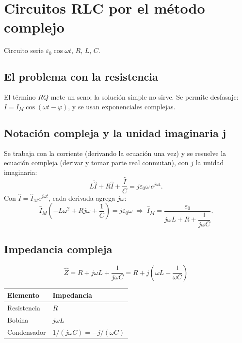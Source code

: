 \documentclass[12pt,a4paper]{article}
\begin{document}
\section{Circuitos RLC por el método complejo}

Circuito serie $\varepsilon_0\cos\omega t$, $R$, $L$, $C$.

\subsection{El problema con la resistencia}

El término $R\dot Q$ mete un seno; la solución simple no sirve. Se permite
desfasaje: $I = I_M\cos(\omega t - \varphi)$, y se usan exponenciales
complejas.

\subsection{Notación compleja y la unidad imaginaria j}

Se trabaja con la corriente (derivando la ecuación una vez) y se resuelve la
ecuación compleja (derivar y tomar parte real conmutan), con $j$ la unidad
imaginaria:
\[
L\ddot{\hat I} + R\dot{\hat I} + \frac{\hat I}{C} = j\varepsilon_0\omega\,
e^{j\omega t}.
\]
Con $\hat I = \hat I_M e^{j\omega t}$, cada derivada agrega $j\omega$:
\[
\hat I_M\left(-L\omega^2 + Rj\omega + \frac{1}{C}\right) = j\varepsilon_0\omega
\;\Longrightarrow\;
\hat I_M = \frac{\varepsilon_0}{j\omega L + R + \dfrac{1}{j\omega C}}.
\]

\subsection{Impedancia compleja}

\begin{keybox}
  \[
  \boxed{\hat Z = R + j\omega L + \frac{1}{j\omega C}
        = R + j\left(\omega L - \frac{1}{\omega C}\right)}
  \]
\end{keybox}



\begin{center}
\begin{tabular}{@{}ll@{}}
\toprule
Elemento & Impedancia \\
\midrule
Resistencia & $R$ \\
Bobina & $j\omega L$ \\
Condensador & $1/(j\omega C) = -j/(\omega C)$ \\
\bottomrule
\end{tabular}
\end{center}
\end{document}
